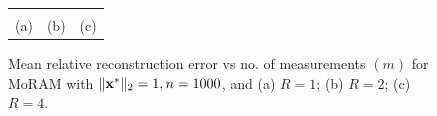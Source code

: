 \begin{figure}[!t]
	\begin{center}
		\begin{tabular}{ccc}
			
			&
			
			&
			 \\
			(a) & (b) & (c)
			
		\end{tabular}
	\end{center}
	\caption{{Mean relative reconstruction error vs no. of measurements $(m)$ for MoRAM with $\|\mathbf{x^*}\|_2=1,n=1000$, and (a) $R=1$; (b) $R=2$; (c) $R=4$.}}
		\label{fig:plot}
\end{figure}
%	
%
%	
%
%	

